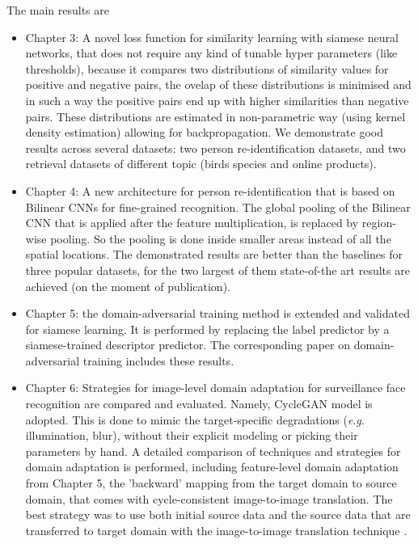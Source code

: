 \documentclass[a4paper, 11pt, oneside]{Thesis}  %
\newcommand{\eg}{\textit{e}.\textit{g}.}
\begin{document}
The main results are
\begin{itemize}
    \item Chapter 3: A novel loss function for similarity learning with siamese neural networks, that does not require any kind of tunable hyper parameters (like thresholds), because it compares two distributions of similarity values for positive and negative pairs, the ovelap of these distributions is minimised and in such a way the positive pairs end up with higher similarities than negative pairs. These distributions are estimated in non-parametric way (using kernel density estimation) allowing for backpropagation. We demonstrate good results across several datasets: two person re-identification datasets, and two retrieval datasets of different topic (birds species and online products). 
    \item Chapter 4:
    A new architecture for person re-identification that is based on Bilinear CNNs for fine-grained recognition.  The global pooling of the Bilinear CNN that is applied after the feature multiplication, is replaced by region-wise pooling. So the pooling is done inside smaller areas instead of all the spatial locations. The demonstrated results are better than the baselines for three popular datasets, for the two largest of them state-of-the art results are achieved (on the moment of publication).
    \item Chapter 5: the domain-adversarial training method  is extended and validated for siamese learning. It is performed by replacing the label predictor by a siamese-trained descriptor predictor. The corresponding paper on domain-adversarial training includes these results.
    
    \item Chapter 6:
 Strategies for image-level domain adaptation for surveillance face recognition are compared and evaluated. Namely, CycleGAN \citep{ZhuPIE17} model is adopted. This is done to mimic the target-specific degradations (\eg{} illumination, blur), without their explicit modeling or picking their parameters by hand. A detailed comparison of techniques and strategies for domain adaptation is performed, including feature-level domain adaptation from Chapter 5, the 'backward' mapping from the target domain to source domain, that comes with cycle-consistent image-to-image translation. The best strategy was to use both initial source data and the source data that are transferred to target domain with the image-to-image translation technique \citep{ZhuPIE17}. 
\end{itemize}
\end{document}
